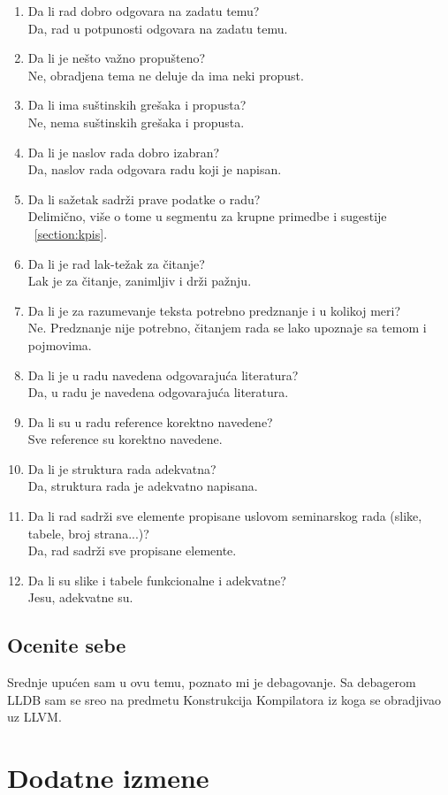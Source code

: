\documentclass[a4paper]{report}
\begin{document}
\begin{enumerate}
\item Da li rad dobro odgovara na zadatu temu?\\
Da, rad u potpunosti odgovara na zadatu temu.
\item Da li je nešto važno propušteno?\\
Ne, obradjena tema ne deluje da ima neki propust.
\item Da li ima suštinskih grešaka i propusta?\\
Ne, nema suštinskih grešaka i propusta.
\item Da li je naslov rada dobro izabran?\\
Da, naslov rada odgovara radu koji je napisan.
\item Da li sažetak sadrži prave podatke o radu?\\
Delimično, više o tome u segmentu za krupne primedbe i sugestije ~\ref{section:kpis}.
\item Da li je rad lak-težak za čitanje?\\
Lak je za čitanje, zanimljiv i drži pažnju.
\item Da li je za razumevanje teksta potrebno predznanje i u kolikoj meri?\\
Ne. Predznanje nije potrebno, čitanjem rada se lako upoznaje sa temom i pojmovima.
\item Da li je u radu navedena odgovarajuća literatura?\\
Da, u radu je navedena odgovarajuća literatura.
\item Da li su u radu reference korektno navedene?\\
Sve reference su korektno navedene.
\item Da li je struktura rada adekvatna?\\
Da, struktura rada je adekvatno napisana.
\item Da li rad sadrži sve elemente propisane uslovom seminarskog rada (slike, tabele, broj strana...)?\\
Da, rad sadrži sve propisane elemente.
\item Da li su slike i tabele funkcionalne i adekvatne?\\
Jesu, adekvatne su.
\end{enumerate}

\section{Ocenite sebe}
Srednje upućen sam u ovu temu, poznato mi je debagovanje. Sa debagerom LLDB sam se sreo na predmetu Konstrukcija Kompilatora iz koga se obradjivao uz LLVM.


\chapter{Dodatne izmene}
\end{document}
